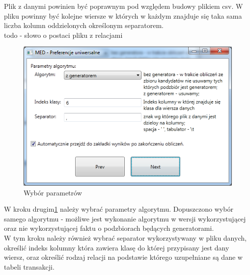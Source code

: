 \documentclass[a4paper,12pt]{article}
\begin{document}
Plik z danymi powinien być poprawnym pod względem budowy plikiem csv. W pliku powinny być kolejne wiersze w których w każdym znajduje się taka sama liczba kolumn oddzielonych określonym separatorem.\\

todo - słowo o postaci pliku z relacjami\\

\begin{figure}[h!]
\begin{center}
\includegraphics[width=\textwidth]{img/2.png}
\caption{Wybór parametrów}
\label{krok2}
\end{center}
\end{figure}

W kroku drugim\ref{krok2} należy wybrać parametry algorytmu. Dopuszczono wybór samego algorytmu - możliwe jest wykonanie algorytmu w wersji wykorzystującej oraz nie wykorzystującej faktu o podzbiorach będących generatorami.\\

W tym kroku należy również wybrać separator wykorzystywany w pliku danych, określić indeks kolumny która zawiera klasę do której przypisany jest dany wiersz, oraz określić rodzaj relacji na podstawie którego uzupełniane są dane w tabeli transakcji.\\
\end{document}
